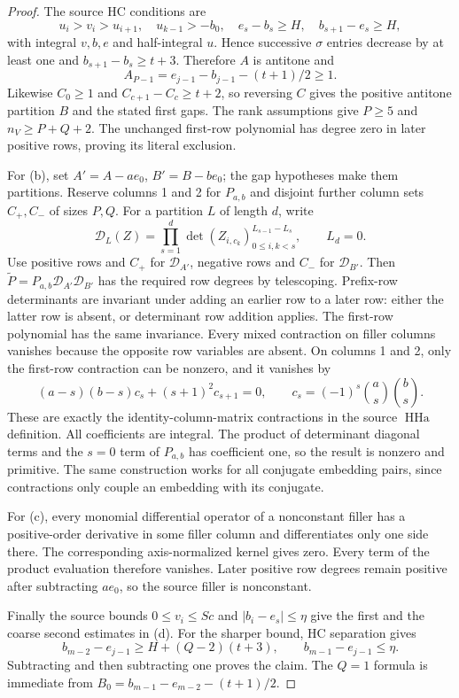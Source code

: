 \begin{proof}
The source HC conditions are
\[
 u_i>v_i>u_{i+1},\quad u_{k-1}>-b_0,\quad
 e_s-b_s\ge H,\quad b_{s+1}-e_s\ge H,
\]
with integral $v,b,e$ and half-integral $u$.
Hence successive $\sigma$ entries decrease by at least one and
$b_{s+1}-b_s\ge t+3$. Therefore $A$ is antitone and
\[
 A_{P-1}=e_{j-1}-b_{j-1}-(t+1)/2\ge1.
\]
Likewise $C_0\ge1$ and $C_{c+1}-C_c\ge t+2$, so reversing $C$
gives the positive antitone partition $B$ and the stated first gaps.
The rank assumptions give $P\ge5$ and $n_V\ge P+Q+2$.
The unchanged first-row polynomial has degree zero in later positive
rows, proving its literal exclusion.

For (b), set $A'=A-ae_0$, $B'=B-be_0$; the gap hypotheses make them
partitions. Reserve columns 1 and 2 for $P_{a,b}$ and disjoint further
column sets $C_+,C_-$ of sizes $P,Q$. For a partition $L$ of length $d$,
write
\[
 \mathcal D_L(Z)=\prod_{s=1}^{d}
 \det(Z_{i,c_k})_{0\le i,k<s}^{L_{s-1}-L_s},\qquad L_d=0.
\]
Use positive rows and $C_+$ for $\mathcal D_{A'}$, negative rows and
$C_-$ for $\mathcal D_{B'}$. Then
$\widetilde P=P_{a,b}\mathcal D_{A'}\mathcal D_{B'}$ has the required
row degrees by telescoping. Prefix-row determinants are invariant under
adding an earlier row to a later row: either the latter row is absent,
or determinant row addition applies. The first-row polynomial has the
same invariance. Every mixed contraction on filler columns vanishes
because the opposite row variables are absent. On columns 1 and 2,
only the first-row contraction can be nonzero, and it vanishes by
\[
 (a-s)(b-s)c_s+(s+1)^2c_{s+1}=0,
 \qquad c_s=(-1)^s\binom as\binom bs.
\]
These are exactly the identity-column-matrix contractions in the source
$\operatorname{HHa}$ definition. All coefficients are integral. The
product of determinant diagonal terms and the $s=0$ term of $P_{a,b}$
has coefficient one, so the result is nonzero and primitive. The same
construction works for all conjugate embedding pairs, since contractions
only couple an embedding with its conjugate.

For (c), every monomial differential operator of a nonconstant filler
has a positive-order derivative in some filler column and differentiates
only one side there. The corresponding axis-normalized kernel gives zero.
Every term of the product evaluation therefore vanishes. Later positive
row degrees remain positive after subtracting $ae_0$, so the source
filler is nonconstant.

Finally the source bounds $0\le v_i\le Sc$ and
$|b_i-e_s|\le\eta$ give the first and the coarse second estimates in (d).
For the sharper bound, HC separation gives
\[
 b_{m-2}-e_{j-1}\ge H+(Q-2)(t+3),
 \qquad b_{m-1}-e_{j-1}\le\eta.
\]
Subtracting and then subtracting one proves the claim. The $Q=1$ formula
is immediate from $B_0=b_{m-1}-e_{m-2}-(t+1)/2$.
\end{proof}

